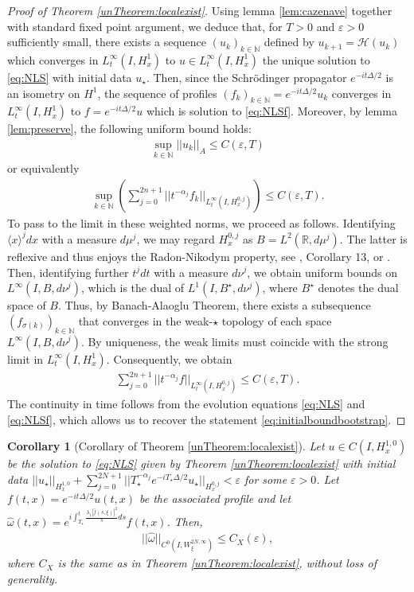 \documentclass[a4paper, 15pt]{article}
\numberwithin{equation}{section}
\newtheorem{cor}[defi]{Corollary}
\begin{document}
\begin{proof}[Proof of Theorem \ref{unTheorem:localexist}]
Using lemma \ref{lem:cazenave} together with standard fixed point argument, we deduce that, for $T>0$ and $\varepsilon>0$ sufficiently small, there exists a sequence $(u_k)_{k\in\mathbb{N}}$ defined by $u_{k+1}=\mathcal{H}(u_k)$ which converges in $L^\infty_t(I,H^1_x)$ to $u\in L^\infty_t(I,H^1_x)$ the unique solution to \eqref{eq:NLS} with initial data $u_\star$. Then, since the Schrödinger propagator $e^{-it\Delta/2}$ is an isometry on $H^1$, the sequence of profiles $(f_k)_{k\in\mathbb{N}}=e^{-it\Delta/2}u_k$ converges in $L^\infty_t(I,H^1_x)$ to $f=e^{-it\Delta/2}u$ which is solution to \eqref{eq:NLSf}. Moreover, by lemma \ref{lem:preserve}, the following uniform bound holds: 
\begin{align}
\sup_{k\in\mathbb{N}}||u_k||_A\leq C(\varepsilon,T)
\end{align} 
or equivalently
\begin{align}
\sup_{k\in\mathbb{N}}(\sum_{j=0}^{2n+1}||t^{-\alpha_j}f_k||_{L^{\infty}_t(I,H^{0,j}_x)})\leq C(\varepsilon,T).
\end{align} 
To pass to the limit in these weighted norms, we proceed as follows. Identifying $\langle x\rangle^jdx$ with a measure $d\mu^j$, we may regard $H^{0,j}_x$ as $B=L^2(\mathbb{R},d\mu^j)$. The latter is reflexive and thus enjoys the Radon-Nikodym property, see \cite{zbMATH03576139}, Corollary 13, or \cite{zbMATH06644896}. Then, identifying further $t^jdt$ with a measure $d\nu^j$, we obtain uniform bounds on $L^{\infty}(I,B,d\nu^j)$, which is the dual of $L^1(I,B^\star,d\nu^j)$, where $B^\star$ denotes the dual space of $B$. Thus, by Banach-Alaoglu Theorem, there exists a subsequence $(f_{\sigma(k)})_{k\in\mathbb{N}}$ that converges in the weak-$\star$ topology of each space $L^\infty(I,B,d\nu^j)$. By uniqueness, the weak limits must coincide with the strong limit in $L^\infty_t(I,H^1_x)$. Consequently, we obtain 
\begin{align}
\sum_{j=0}^{2n+1}||t^{-\alpha_j}f||_{L^{\infty}_t(I,H^{0,j}_x)}\leq C(\varepsilon,T).
\end{align} 
The continuity in time follows from the evolution equations \eqref{eq:NLS} and \eqref{eq:NLSf}, which allows us to recover the statement \eqref{eq:initialboundbootstrap}.
\end{proof}
\begin{cor}[Corollary of Theorem \ref{unTheorem:localexist}]
\label{cor:modprof}
Let $u\in C(I,H^{1,0}_x)$ be the solution to \eqref{eq:NLS} given by Theorem \ref{unTheorem:localexist} with initial data $||u_\star||_{H^{1,0}_x}+\sum^{2N+1}_{j=0}||T_\star^{-\alpha_j}e^{-iT_\star\Delta/2}u_\star||_{H^{0,j}_x}<\varepsilon$ for some $\varepsilon>0$. Let $f(t,x)=e^{-it\Delta/2}u(t,x)$ be the associated profile and let $\hat{\omega}(t,x)=e^{i\int^t_{T_\star}\frac{\lambda_1|\hat{f}(s,\xi)|^2}{s}ds}f(t,x)$. Then,
\begin{align}
\label{eq:omegaevoineq}
||\hat{\omega}||_{C^0(I,W^{2N,\infty}_\xi)}\leq C_X(\varepsilon),
\end{align}
where $C_X$ is the same as in Theorem \ref{unTheorem:localexist}, without loss of generality.\\
\end{cor}
\end{document}
